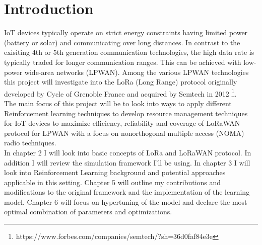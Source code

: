 \chapter{Introduction}


IoT devices typically operate on strict energy constraints having limited power (battery or solar) and communicating over long distances. In contrast to the exisiting 4th or 5th generation communication technologies, the high data rate is typically traded for longer communication ranges. This can be achieved with low-power wide-area networks (LPWAN). Among the various LPWAN technologies this project will investigate into the LoRa (Long Range) protocol originally developed by Cycle of Grenoble France and acquired by Semtech in 2012 \footnote{https://www.forbes.com/companies/semtech/?sh=36d0faf84e3e}.\\

The main focus of this project will be to look into ways to apply different Reinforcement learning techniques to develop resource management techniques for IoT devices to maximize efficiency, reliability and coverage of LoRaWAN protocol for LPWAN with a focus on nonorthogonal multiple access (NOMA) radio techniques. \\

In chapter 2 I will look into basic concepts of LoRa and LoRaWAN protocol. In addition I will review the simulation framework I'll be using. In chapter 3 I will look into Reinforcement Learning 
background and potential approaches applicable in this setting.
Chapter 5 will outline my contributions and modifications
to the original framework and the implementation of the learning 
model. Chapter 6 will focus on hypertuning of the model 
and declare the most optimal combination of parameters and optimizations.
